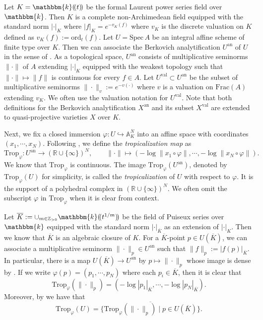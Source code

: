 \documentclass[reqno, 12pt]{amsart}
\theoremstyle{definition}
\newcommand{\bR}{\mathbb{R}}
\newcommand{\bA}{\mathbb{A}}
\newcommand{\bZ}{\mathbb{Z}}
\newcommand{\bG}{\mathbb{G}}
\newcommand{\bT}{\mathbb{T}}
\newcommand{\bk}{\mathbbm{k}}
\newcommand{\fm}{\mathfrak{m}}
\newcommand{\Spec}{\mathrm{Spec}}
\newcommand{\ord}{\mathrm{ord}}
\newcommand{\Trop}{\mathrm{Trop}}
\newcommand{\an}{\mathrm{an}}
\newcommand{\val}{\mathrm{val}}
\newcommand{\oK}{\overline{K}}
\numberwithin{equation}{section}
\begin{document}
Let $K = \bk(\!(t)\!)$ be the formal Laurent power series field over $\bk$. Then $K$ is a complete non-Archimedean field equipped with the standard norm $|\cdot |_K$ where $|f|_K= e^{-v_K(f)}$ where $v_K$ is the discrete valuation on $K$ defined as $v_K(f) := \ord_t(f)$. %
Let $U = \Spec\, A$ be an integral affine scheme of finite type over $K$. Then we can associate the Berkovich analytification $U^{\an}$ of $U$ in the sense of \cite{Ber90}. As a topological space, $U^{\an}$ consists of multiplicative seminorms $\|\cdot\|$ of $A$ extending $|\cdot|_K$ equipped with the weakest topology such that $\|\cdot\|\mapsto \|f\|$ is continuous for every $f\in A$. Let $U^{\val}\subset U^{\an}$ be the subset of multiplicative seminorms $\|\cdot \|_{v}:= e^{-v(\cdot)}$ where $v$ is a valuation on $\mathrm{Frac}(A)$ extending $v_K$. We often use the valuation notation for $U^{\val}$. Note that both definitions for the Berkovich analytification $X^{\an}$ and its subset $X^{\val}$ are extended to quasi-projective varieties $X$ over $K$.

Next, we fix a closed immersion $\varphi: U\hookrightarrow \bA_K^N$ into an affine space with coordinates $(x_1, \cdots, x_N)$. Following \cite{Gub13}, we define the \emph{tropicalization map} as 
\[
\Trop_{\varphi}: U^{\an} \to (\bR\cup\{\infty\})^N,\qquad \|\cdot\| \mapsto (-\log \|x_1\circ \varphi\|, \cdots, -\log \|x_N\circ \varphi\|). 
\]
We know that $\Trop_{\varphi}$ is continuous.
The image $\Trop_\varphi(U^{\an})$, denoted by $\Trop_\varphi(U)$ for simplicity, is called the \emph{tropicalization} of $U$ with respect to $\varphi$. It is the support of a polyhedral complex in $(\bR\cup\{\infty\})^N$.
We often omit the subscript $\varphi$ in $\Trop_\varphi$ when it is clear from context. 

Let $\oK: = \cup_{m\in \bZ_{>0}} \bk(\!(t^{1/m})\!)$ be the field of Puiseux series over $\bk$ equipped with the standard norm $|\cdot|_{\oK}$ as an  extension of $|\cdot|_K$. Then we know that $\oK$ is an algebraic closure of $K$. For a $\oK$-point $p\in U(\oK)$, %
we can associate a multiplicative seminorm $\|\cdot\|_p\in U^{\an}$ such that 
$\|f\|_p :=|f(p)|_{\oK}$.
In particular, there is a map $U(\oK) \to U^{\an}$ by $p\mapsto \|\cdot\|_p$ whose image is dense by \cite[2.6]{Gub13}. If we write
$\varphi(p) = (p_1,\cdots, p_N)$ where each $p_i\in \oK$, then it is clear that 
\[
\Trop_{\varphi}(\|\cdot\|_p) = (-\log |p_1|_{\oK},\cdots, -\log|p_N|_{\oK}).
\]
Moreover, by \cite[Proposition 3.8]{Gub13} we have that 
\[
\Trop_{\varphi}(U) = \overline{\{\Trop_{\varphi}(\|\cdot\|_p)\mid p\in U(\oK)\}}.
\]
\end{document}

